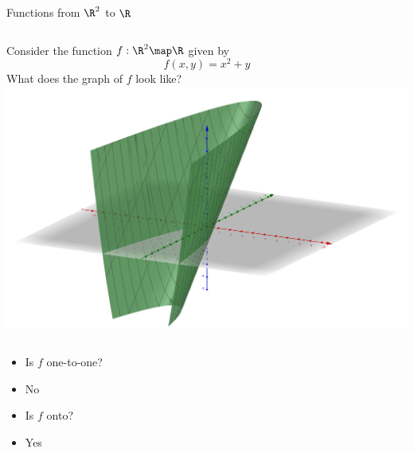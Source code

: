 \documentclass{beamer}
\begin{document}
\begin{frame}{Functions from $\R^2$ to $\R$}

\begin{columns}
\column[T]{5cm}
Consider the function $f:\R^2\map\R$ given by
$$f(x,y) = x^2 + y$$
What does the graph of $f$ look like?
\column[T]{5cm}
\includegraphics[scale=0.15]{x-squared-plus-y}
\end{columns}

\begin{itemize}
\item Is $f$ one-to-one?
\item No
\item Is $f$ onto?
\item Yes
\end{itemize}

\end{frame}
\end{document}
